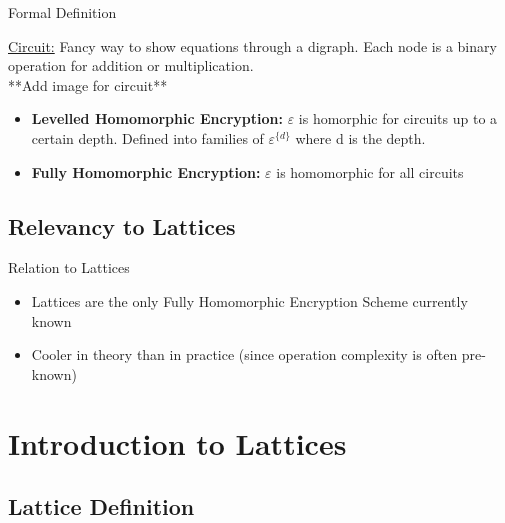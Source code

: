 \documentclass{beamer}
\begin{document}
\begin{frame}{Formal Definition} %
	
	\underline{Circuit:} Fancy way to show equations through a digraph. Each node is a binary operation for addition or multiplication. \\
	**Add image for circuit**
	\vspace{0.5cm}

	\begin{itemize}
	\item \textbf{Levelled Homomorphic Encryption: }$\varepsilon$ is homorphic for circuits up to a certain depth. Defined into families of $\varepsilon^{\{d\}}$ where d is the depth. \\ %
	\item \textbf{Fully Homomorphic Encryption: }$\varepsilon$ is homomorphic for all circuits
	\end{itemize}
	
\end{frame}


{
\subsection{Relevancy to Lattices}} %

\begin{frame}{Relation to Lattices}
    \begin{itemize}
	\item Lattices are the only Fully Homomorphic Encryption Scheme currently known
	\item Cooler in theory than in practice (since operation complexity is often pre-known)
	\end{itemize}
\end{frame}

\begin{frame} %
\tableofcontents[sectionstyle=show,subsectionstyle=show/shaded/hide,subsubsectionstyle=show/shaded/hide]
\end{frame}


\section{Introduction to Lattices} %
\subsection{Lattice Definition}
\end{document}
